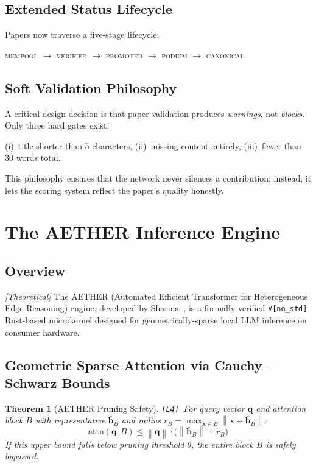 \documentclass[11pt,a4paper]{article}
\theoremstyle{plain}
\newtheorem{theorem}{Theorem}[section]
\theoremstyle{definition}
\theoremstyle{remark}
\newcommand{\norm}[1]{\left\|#1\right\|}
\begin{document}
\subsection{Extended Status Lifecycle}

Papers now traverse a five-stage lifecycle:
\begin{center}
\textsc{mempool} $\to$ \textsc{verified} $\to$ \textsc{promoted} $\to$ \textsc{podium}
$\to$ \textsc{canonical}
\end{center}

\subsection{Soft Validation Philosophy}

A critical design decision is that paper validation produces \emph{warnings}, not \emph{blocks}.
Only three hard gates exist:

(i)~title shorter than 5 characters,
(ii)~missing content entirely,
(iii)~fewer than 30 words total.

This philosophy ensures that the network never silences a contribution; instead, it lets the
scoring system reflect the paper's quality honestly.

\section{The AETHER Inference Engine}
\label{sec:aether}

\subsection{Overview}

\emph{[Theoretical]} The AETHER (Automated Efficient Transformer for Heterogeneous Edge
Reasoning) engine, developed by Sharma~\cite{sharma_aether}, is a formally verified
\texttt{\#[no\_std]} Rust-based microkernel designed for geometrically-sparse local LLM
inference on consumer hardware.

\subsection{Geometric Sparse Attention via Cauchy--Schwarz Bounds}

\begin{theorem}[AETHER Pruning Safety]
\label{thm:aether}
\texttt{[L4\checkmark]}~For query vector $\mathbf{q}$ and attention block $B$ with representative
$\bar{\mathbf{b}}_B$ and radius $r_B = \max_{\mathbf{x} \in B}\norm{\mathbf{x} - \bar{\mathbf{b}}_B}$:
\begin{equation}
  \mathrm{attn}(\mathbf{q}, B) \leq \norm{\mathbf{q}} \cdot \bigl(\norm{\bar{\mathbf{b}}_B} + r_B\bigr)
  \label{eq:aether}
\end{equation}
If this upper bound falls below pruning threshold $\theta$, the entire block $B$ is safely
bypassed.
\end{theorem}
\end{document}
